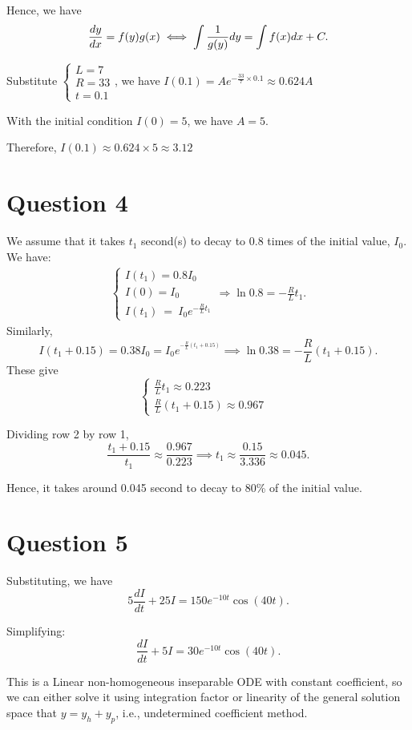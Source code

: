 \documentclass[12pt,a4paper]{article}
\begin{document}
\begin{solution}
\begin{remark}
Hence, we have 
\[
\frac{dy}{dx} = f(y)g(x) \iff \int \frac{1}{g(y)} dy = \int f(x) d x + C.
\]


\end{remark}

Substitute $\begin{cases}
L=7\\R=33\\t=0.1
\end{cases}$, we have $I(0.1) = Ae^{-\frac{33}{7}\times 0.1} \approx 0.624A $

With the initial condition $I(0) = 5$, we have $A = 5$.

Therefore, $I(0.1) \approx 0.624\times 5 \approx 3.12$
\end{solution}

\section*{Question 4}
\begin{solution}
We assume that it takes $\displaystyle t_{1}$ second(s) to decay to 0.8 times of the initial value, $\displaystyle I_{0}$. We have:
\begin{gather*}
\begin{cases}
I( t_{1}) =0.8I_{0}  \\
I(0) = I_0\\
I( t_{1}) \ =\ I_{0} e^{-\frac{R}{L} t_{1}} 
\end{cases} \Longrightarrow \ln 0.8={-\frac{R}{L} t_{1}}.
\end{gather*}
Similarly,
\begin{equation*}
I( t_{1} +0.15) =0.38I_{0} = I_0 e^{^{-\frac{R}{L}( t_{1} +0.15)}} 
\implies \ln0.38 = -\frac{R}{L}( t_{1} +0.15).
\end{equation*}
These give
\[
\begin{cases}
\frac{R}{L} t_{1} \approx 0.223 & \\
\frac{R}{L}( t_{1} +0.15) \approx 0.967 & 
\end{cases}
\]

Dividing row 2 by row 1,
\[
\frac{t_{1} +0.15}{t_1} \approx \frac{0.967}{0.223} \implies t_1 \approx \frac{0.15}{3.336} \approx0.045.
\]

Hence, it takes around 0.045 second to decay to 80\% of the initial value.
\end{solution}

\section*{Question 5}
\begin{solution}
Substituting, we have
\[
5\frac{dI}{dt} +25I=150e^{-10t}\cos( 40t).
\]

Simplifying:
\[
\frac{dI}{dt} +5I=30e^{-10t}\cos( 40t).
\]

This is a Linear non-homogeneous inseparable ODE with constant coefficient, so we can either solve it using integration factor or linearity of the general solution space that $y=y_h+y_p$, i.e., undetermined coefficient method. 
\end{solution}
\end{document}
